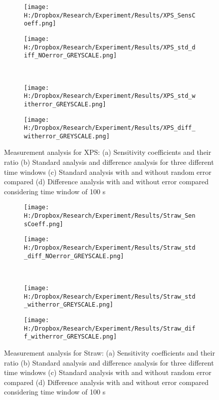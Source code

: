 \documentclass[12pt]{article}
\begin{document}
\begin{figure}
\begin{subfigure}{.5\textwidth}
\centering
\texttt{[image: H:/Dropbox/Research/Experiment/Results/XPS\_SensCoeff.png]}
\caption{}
\end{subfigure}\hfill
\begin{subfigure}{.5\textwidth}
\centering
\texttt{[image: H:/Dropbox/Research/Experiment/Results/XPS\_std\_diff\_NOerror\_GREYSCALE.png]}
\caption{}
\end{subfigure}\\
\begin{subfigure}{.5\textwidth}
\centering
\texttt{[image: H:/Dropbox/Research/Experiment/Results/XPS\_std\_witherror\_GREYSCALE.png]}
\caption{}
\end{subfigure}\hfill
\begin{subfigure}{.5\textwidth}
\centering
\texttt{[image: H:/Dropbox/Research/Experiment/Results/XPS\_diff\_witherror\_GREYSCALE.png]}
\caption{}
\end{subfigure}
\caption{Measurement analysis for XPS: (a) Sensitivity coefficients and their ratio (b) Standard analysis and difference analysis for three different time windows (c) Standard analysis with and without random error compared (d) Difference analysis with and without error compared considering time window of 100 s}

\end{figure}


\begin{figure}
\begin{subfigure}{.5\textwidth}
\centering
\texttt{[image: H:/Dropbox/Research/Experiment/Results/Straw\_SensCoeff.png]}
\caption{}
\end{subfigure}\hfill
\begin{subfigure}{.5\textwidth}
\centering
\texttt{[image: H:/Dropbox/Research/Experiment/Results/Straw\_std\_diff\_NOerror\_GREYSCALE.png]}
\caption{}
\end{subfigure}\\
\begin{subfigure}{.5\textwidth}
\centering
\texttt{[image: H:/Dropbox/Research/Experiment/Results/Straw\_std\_witherror\_GREYSCALE.png]}
\caption{}
\end{subfigure}\hfill
\begin{subfigure}{.5\textwidth}
\centering
\texttt{[image: H:/Dropbox/Research/Experiment/Results/Straw\_diff\_witherror\_GREYSCALE.png]}
\caption{}
\end{subfigure}
\caption{Measurement analysis for Straw: (a) Sensitivity coefficients and their ratio (b) Standard analysis and difference analysis for three different time windows (c) Standard analysis with and without random error compared (d) Difference analysis with and without error compared considering time window of 100 s}

\end{figure}
\end{document}
